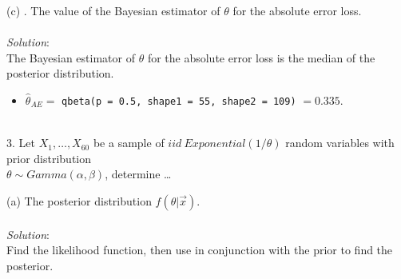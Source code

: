 \documentclass[12pt]{article}
\newcommand{\XB}{\color{black}}
\newcommand{\XBB}{\color{blue}}
\newcommand{\ds}{\displaystyle}
\begin{document}
\vspace{2.5mm}

(c) . The value of the Bayesian estimator of $ \theta $ for the absolute error loss. \\
\vspace{2.5mm} \\
\textit{Solution}:
\vspace{2.5mm} \\

\noindent
The Bayesian estimator of $ \theta $ for the absolute error loss is the median of the posterior distribution. \\

\begin{itemize}
    \item $ \ds \hat{\theta}_{AE} = $ {\XBB \texttt{qbeta(p = 0.5, shape1 = 55, shape2 = 109)}} $ = 0.335 $.
\end{itemize}

\vspace{2.5mm}

\newpage
\XBB\hrulefill\XB \\

3. Let $ X_{1}, \dots , X_{60} $ be a sample of $ iid \ Exponential(1 / \theta) $ random variables
with prior distribution \\ $ \theta \sim Gamma(\alpha, \beta) $, determine \dots \\

\XBB\hrulefill\XB
\vspace{5mm}

(a) The posterior distribution $ f(\theta | \overrightarrow{x}) $. \\
\vspace{2.5mm} \\
\textit{Solution}:
\vspace{2.5mm} \\

\noindent
Find the likelihood function, then use in conjunction with the prior to find the posterior. \\
\end{document}
